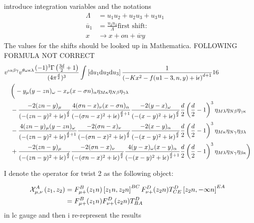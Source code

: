 introduce integration variables and the notations
\begin{align}
	\Lambda &= u_1u_2+u_2u_3+u_3u_1\\
	\overline u_1 &= \frac{u_2u_3}{\Lambda}
	\text{first shift:}&
	\\
	x&\rightarrow x + on + \overline w y
\end{align}
The values for the shifts should be looked up in Mathematica.
FOLLOWING FORMULA NOT CORRECT
\renewcommand{\dxabc}{\left[\dx u_1 \dx u_2 \dx u_3\right] }
\begin{align}
	&v^{\iota\alpha\beta\gamma}v^{\theta\omega\kappa\lambda}\frac{(-1)^3\Gamma\left(\frac{3d}{2}+1\right)}{(4\pi^{\frac{d}{2}})^3} \int \dxabc \frac{1}{\left(-K x ^2 -f(u{1-3},n,y)+\imag \epsilon\right)^{d+1}}16
	\nl \bigg( -y_\mu (y-zn)_\omega -x_\nu (x-\sigma n)_\alpha \metric_{M\kappa}\metric_{N\beta}\metric_{\gamma\lambda}
	\nl
	- \frac{-2(zn-y)_\mu}{\left(-(zn-y)^2+\imag \epsilon\right)^{\frac{d}{2}}}\frac{4(\sigma n-x)_\nu(x-\sigma n)_\alpha}{\left(-(\sigma n-x)^2+\imag \epsilon\right)^{\frac{d}{2}+1}} \frac{-2(y-x)_\omega}{\left(-(x-y)^2+\imag \epsilon\right)^{\frac{d}{2}}}\frac{d}{2}\left(\frac{d}{2}-1\right)^3\metric_{M\lambda}\metric_{N\beta}\metric_{\gamma\kappa}
	\nl
	-\frac{4(zn-y)_\mu(y-zn)_\omega}{\left(-(zn-y)^2+\imag \epsilon\right)^{\frac{d}{2}+1}}\frac{-2(\sigma n-x)_\nu}{\left(-(\sigma n-x)^2+\imag \epsilon\right)^{\frac{d}{2}}} \frac{-2(x-y)_\alpha}{\left(-(x-y)^2+\imag \epsilon\right)^{\frac{d}{2}}}\frac{d}{2}\left(\frac{d}{2}-1\right)^3\metric_{M\kappa}\metric_{N\gamma}\metric_{\beta\lambda}
	\nl
	+\frac{-2(zn-y)_\mu}{\left(-(zn-y)^2+\imag \epsilon\right)^{\frac{d}{2}}}\frac{-2(\sigma n-x)_\nu}{\left(-(\sigma n-x)^2+\imag \epsilon\right)^{\frac{d}{2}}} \frac{4(y-x)_\omega(x-y)_\alpha}{\left(-(x-y)^2+\imag \epsilon\right)^{\frac{d}{2}+1}}\frac{d}{2}\left(\frac{d}{2}-1\right)^3\metric_{M\lambda}\metric_{N\gamma}\metric_{\beta\kappa}\bigg)
\end{align}

I denote the operator for twist 2 as the following object:

\begin{align}
	\twtwoop{z_1}{z_2}{A}{\mu}{\nu}
	&=
	\ft_{\mu +}^B(z_1n)\wil{z_1n}{z_2n}^{BC}\ft_{\nu+}^D(z_2n)T^D_{CE}\wil{z_2n}{-\infty n}^{EA}
	\\
	&=
	\ft_{\mu +}^B(z_1n)\ft_{\nu+}^D(z_2n)T^D_{BA}
\end{align}
in lc gauge 
and then i re-represent the results 

